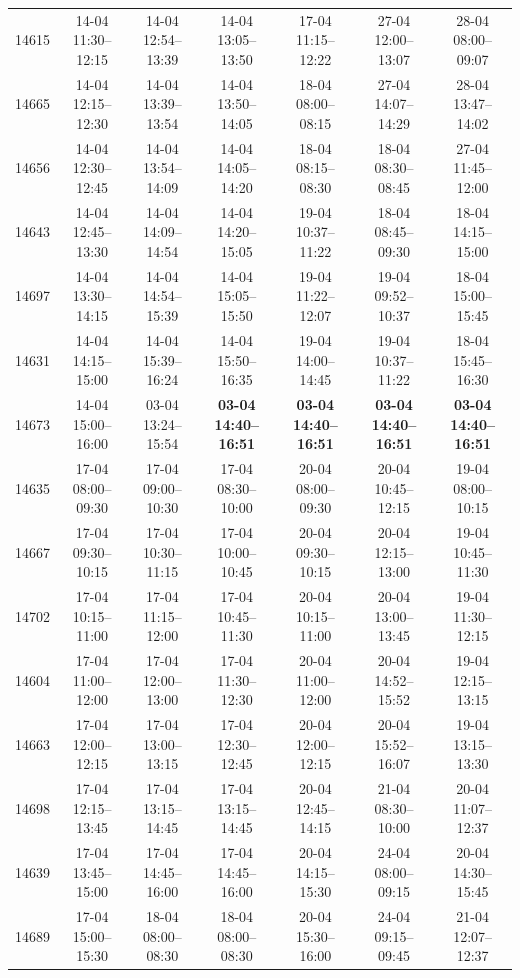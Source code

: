 \begin{table}[htbp]
\begin{tabular}{|r|c|c|c|c|c|c|}
14615 & 14-04 11:30--12:15 & 14-04 12:54--13:39 & 14-04 13:05--13:50 & 17-04 11:15--12:22 & 27-04 12:00--13:07 & 28-04 08:00--09:07 \\ 
14665 & 14-04 12:15--12:30 & 14-04 13:39--13:54 & 14-04 13:50--14:05 & 18-04 08:00--08:15 & 27-04 14:07--14:29 & 28-04 13:47--14:02 \\ 
14656 & 14-04 12:30--12:45 & 14-04 13:54--14:09 & 14-04 14:05--14:20 & 18-04 08:15--08:30 & 18-04 08:30--08:45 & 27-04 11:45--12:00 \\ 
14643 & 14-04 12:45--13:30 & 14-04 14:09--14:54 & 14-04 14:20--15:05 & 19-04 10:37--11:22 & 18-04 08:45--09:30 & 18-04 14:15--15:00 \\ 
14697 & 14-04 13:30--14:15 & 14-04 14:54--15:39 & 14-04 15:05--15:50 & 19-04 11:22--12:07 & 19-04 09:52--10:37 & 18-04 15:00--15:45 \\ 
14631 & 14-04 14:15--15:00 & 14-04 15:39--16:24 & 14-04 15:50--16:35 & 19-04 14:00--14:45 & 19-04 10:37--11:22 & 18-04 15:45--16:30 \\ 
14673 & 14-04 15:00--16:00 & 03-04 13:24--15:54 & \textbf{03-04 14:40--16:51} & \textbf{03-04 14:40--16:51} & \textbf{03-04 14:40--16:51} & \textbf{03-04 14:40--16:51} \\ 
14635 & 17-04 08:00--09:30 & 17-04 09:00--10:30 & 17-04 08:30--10:00 & 20-04 08:00--09:30 & 20-04 10:45--12:15 & 19-04 08:00--10:15 \\ 
14667 & 17-04 09:30--10:15 & 17-04 10:30--11:15 & 17-04 10:00--10:45 & 20-04 09:30--10:15 & 20-04 12:15--13:00 & 19-04 10:45--11:30 \\ 
14702 & 17-04 10:15--11:00 & 17-04 11:15--12:00 & 17-04 10:45--11:30 & 20-04 10:15--11:00 & 20-04 13:00--13:45 & 19-04 11:30--12:15 \\ 
14604 & 17-04 11:00--12:00 & 17-04 12:00--13:00 & 17-04 11:30--12:30 & 20-04 11:00--12:00 & 20-04 14:52--15:52 & 19-04 12:15--13:15 \\ 
14663 & 17-04 12:00--12:15 & 17-04 13:00--13:15 & 17-04 12:30--12:45 & 20-04 12:00--12:15 & 20-04 15:52--16:07 & 19-04 13:15--13:30 \\ 
14698 & 17-04 12:15--13:45 & 17-04 13:15--14:45 & 17-04 13:15--14:45 & 20-04 12:45--14:15 & 21-04 08:30--10:00 & 20-04 11:07--12:37 \\ 
14639 & 17-04 13:45--15:00 & 17-04 14:45--16:00 & 17-04 14:45--16:00 & 20-04 14:15--15:30 & 24-04 08:00--09:15 & 20-04 14:30--15:45 \\ 
14689 & 17-04 15:00--15:30 & 18-04 08:00--08:30 & 18-04 08:00--08:30 & 20-04 15:30--16:00 & 24-04 09:15--09:45 & 21-04 12:07--12:37 \\ 

\end{tabular}
\end{table}
